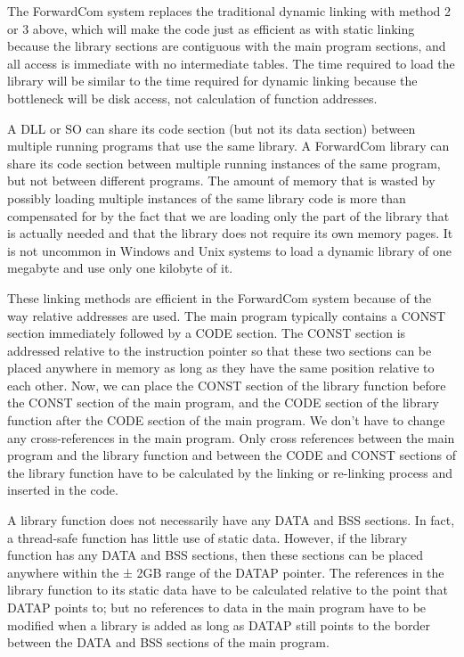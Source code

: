 \documentclass[forwardcom.tex]{subfiles}
\begin{document}
The ForwardCom system replaces the traditional dynamic linking with method 2 or 3 above, which will make the code just as efficient as with static linking because the library sections are contiguous with the main program sections, and all access is immediate with no intermediate tables. The time required to load the library will be similar to the time required for dynamic linking because the bottleneck will be disk access, not calculation of function addresses. 
\vspace{2mm}

A DLL or SO can share its code section (but not its data section) between multiple running programs that use the same library. A ForwardCom library can share its code section between multiple running instances of the same program, but not between different programs. The amount of memory that is wasted by possibly loading multiple instances of the same library code is more than compensated for by the fact that we are loading only the part of the library that is actually needed and that the library does not require its own memory pages. It is not uncommon in Windows and Unix systems to load a dynamic library of one megabyte and use only one kilobyte of it. 
\vspace{2mm}

These linking methods are efficient in the ForwardCom system because of the way relative addresses are used. The main program typically contains a CONST section immediately followed by a CODE section. The CONST section is addressed relative to the instruction pointer so that these two sections can be placed anywhere in memory as long as they have the same position relative to each other. Now, we can place the CONST section of the library function before the CONST section of the main program, and the CODE section of the library function after the CODE section of the main program. We don't have to change any cross-references in the main program. Only cross references between the main program and the library function and between the CODE and CONST sections of the library function have to be calculated by the linking or re-linking process and inserted in the code.
\vspace{2mm}

A library function does not necessarily have any DATA and BSS sections. In fact, a thread-safe function has little use of static data. However, if the library function has any DATA and BSS sections, then these sections can be placed anywhere within the ± 2GB range of the DATAP pointer. The references in the library function to its static data have to be calculated relative to the point that DATAP points to; but no references to data in the main program have to be modified when a library is added as long as DATAP still points to the border between the DATA and BSS sections of the main program. 
\vspace{2mm}
\end{document}
